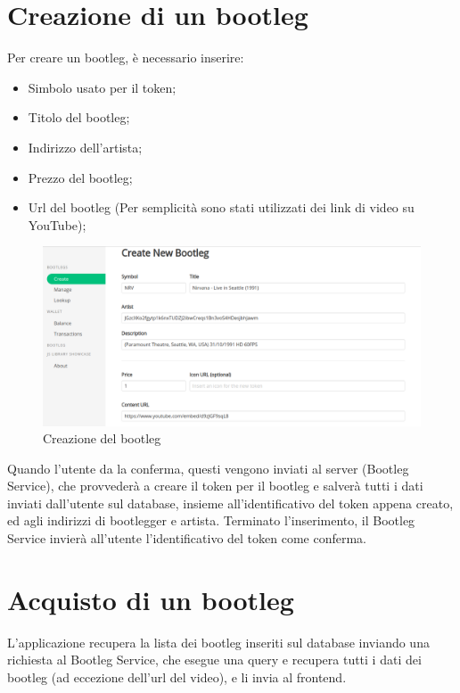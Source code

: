 \section{Creazione di un bootleg}

Per creare un bootleg, è necessario inserire:
\begin{itemize}
    \item Simbolo usato per il token;
    \item Titolo del bootleg;
    \item Indirizzo dell'artista;
    \item Prezzo del bootleg;
    \item Url del bootleg (Per semplicità sono stati utilizzati dei link di video su YouTube);
\end{itemize}

\begin{figure}[H]
    \includegraphics[width=\linewidth]{images/application/create-bootleg.png}
    \caption{Creazione del bootleg}
    \label{fig:bootleg_create}
\end{figure}

Quando l'utente da la conferma, questi vengono inviati al server (Bootleg Service), che provvederà a creare il token per il bootleg e salverà tutti i dati inviati dall'utente sul database, insieme all'identificativo del token appena creato, ed agli indirizzi di bootlegger e artista. Terminato l'inserimento, il Bootleg Service invierà all'utente l'identificativo del token come conferma.

\section{Acquisto di un bootleg}

L'applicazione recupera la lista dei bootleg inseriti sul database inviando una richiesta al Bootleg Service, che esegue una query e recupera tutti i dati dei bootleg (ad eccezione dell'url del video), e li invia al frontend.

